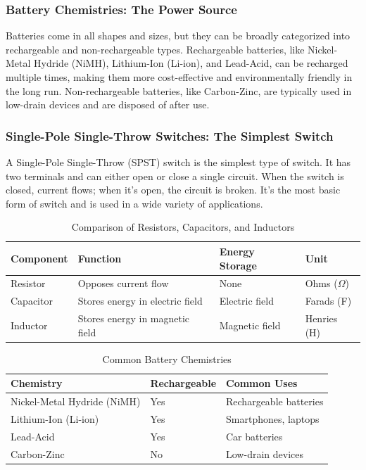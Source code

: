 \subsubsection*{Battery Chemistries: The Power Source}
Batteries come in all shapes and sizes, but they can be broadly categorized into rechargeable and non-rechargeable types. Rechargeable batteries, like Nickel-Metal Hydride (NiMH), Lithium-Ion (Li-ion), and Lead-Acid, can be recharged multiple times, making them more cost-effective and environmentally friendly in the long run. Non-rechargeable batteries, like Carbon-Zinc, are typically used in low-drain devices and are disposed of after use.

\subsubsection*{Single-Pole Single-Throw Switches: The Simplest Switch}
A Single-Pole Single-Throw (SPST) switch is the simplest type of switch. It has two terminals and can either open or close a single circuit. When the switch is closed, current flows; when it's open, the circuit is broken. It's the most basic form of switch and is used in a wide variety of applications.

\begin{table}[h!]
    \centering
    \caption{Comparison of Resistors, Capacitors, and Inductors}
    \label{tab:resistor-capacitor-inductor-comparison}
    \begin{tabular}{|l|l|l|l|}
        \hline
        \textbf{Component} & \textbf{Function} & \textbf{Energy Storage} & \textbf{Unit} \\
        \hline
        Resistor & Opposes current flow & None & Ohms ($\Omega$) \\
        Capacitor & Stores energy in electric field & Electric field & Farads (F) \\
        Inductor & Stores energy in magnetic field & Magnetic field & Henries (H) \\
        \hline
    \end{tabular}
\end{table}

\begin{table}[h!]
    \centering
    \caption{Common Battery Chemistries}
    \label{tab:battery-chemistries}
    \begin{tabular}{|l|l|l|}
        \hline
        \textbf{Chemistry} & \textbf{Rechargeable} & \textbf{Common Uses} \\
        \hline
        Nickel-Metal Hydride (NiMH) & Yes & Rechargeable batteries \\
        Lithium-Ion (Li-ion) & Yes & Smartphones, laptops \\
        Lead-Acid & Yes & Car batteries \\
        Carbon-Zinc & No & Low-drain devices \\
        \hline
    \end{tabular}
\end{table}


